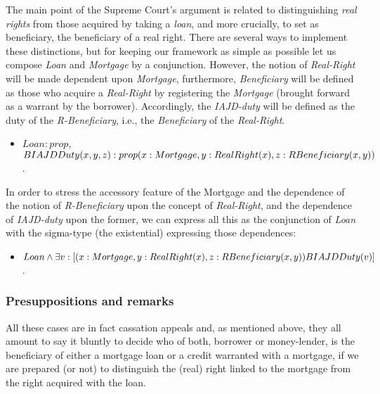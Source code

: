 				The main point of the Supreme Court’s argument is related to distinguishing \textit{real rights} from those acquired by taking a \textit{loan}, and more crucially, to set as beneficiary, the beneficiary of a real right. There are several ways to implement these distinctions, but for keeping our framework as simple as possible let us compose \textit{Loan} and \textit{Mortgage} by a conjunction. However, the notion of \textit{Real-Right} will be made dependent upon \textit{Mortgage}, furthermore, \textit{Beneficiary} will be defined as those who acquire a \textit{Real-Right} by registering the \textit{Mortgage} (brought forward as a warrant by the borrower). Accordingly, the \textit{IAJD-duty} will be defined as the duty of the \textit{R-Beneficiary}, i.e., the \textit{Beneficiary} of the \textit{Real-Right}.
				\begin{itemize}
					\item $Loan: prop$, \\
						$BIAJDDuty(x,y,z): prop (x: Mortgage, \\ y: RealRight(x), z: RBeneficiary\index{beneficiary}(x,y))$.
				\end{itemize}
			
			In order to stress the accessory feature of the Mortgage and the dependence of the notion of \textit{R-Beneficiary} upon the concept of \textit{Real-Right}, and the dependence of \textit{IAJD-duty} upon the former, we can express all this as the conjunction of \textit{Loan} with the sigma-type (the existential) expressing those dependences:
				\begin{itemize}
					\item $Loan \land \exists v: [(x: Mortgage, y: RealRight(x), \\ z: RBeneficiary\index{beneficiary}(x,y)) BIAJDDuty(v)]$.
				\end{itemize}
			
			\subsubsection{Presuppositions and remarks}
			
			
			All these cases are in fact cassation appeals and, as mentioned above, they all amount to say it bluntly to decide who of both, borrower or money-lender, is the beneficiary of either a mortgage loan or a credit warranted with a mortgage, if we are prepared (or not) to distinguish the (real) right linked to the mortgage from the right acquired with the loan.
			
